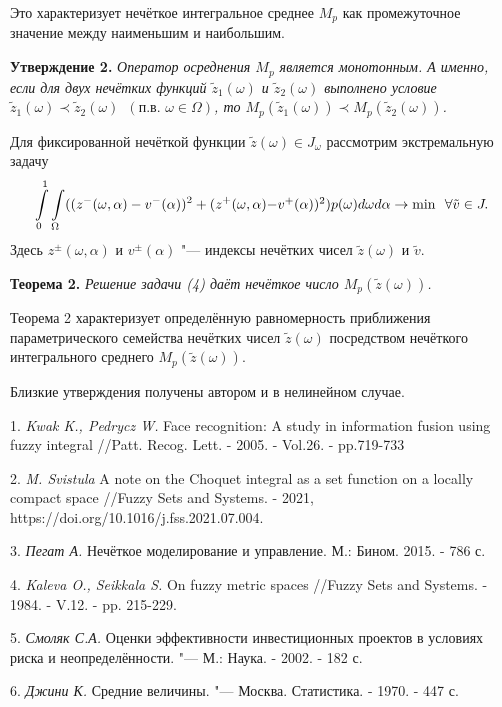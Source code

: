 Это характеризует нечёткое интегральное среднее $M_p$ как промежуточное значение между наименьшим и наибольшим.

\textbf{Утверждение  2.} \textit{Оператор осреднения $M_p$ является монотонным. А именно, если для двух нечётких функций $\tilde{z}_1(\omega)$ и  $\tilde{z}_2(\omega)$ выполнено условие  $\tilde{z}_1(\omega)\prec\tilde{z}_2(\omega)$\,\,\,$(\text{п.в.}\,\,\omega\in\Omega)$, то $M_p(\tilde{z}_1(\omega))\prec M_p(\tilde{z}_2(\omega))$.
}


Для фиксированной нечёткой функции $\tilde{z}(\omega)\in J_{\omega}$ рассмотрим экстремальную задачу
\begin{equation}
\int\limits_{0}^1\int\limits_{\Omega}((z^{-}(\omega, \alpha) - v^{-}(\alpha))^2 + (z^{+}(\omega, \alpha) $$$$- v^{+}(\alpha))^2)p(\omega)d\omega d\alpha\rightarrow\min\,\,\,\forall \tilde{v}\in J.
\end{equation}
Здесь $z^{\pm}(\omega, \alpha)$ и  $v^{\pm}(\alpha)$  "--- индексы нечётких  чисел $\tilde{z}(\omega)$ и  $\tilde{v}$.

\textbf{Теорема 2.} \textit{Решение задачи (4) даёт нечёткое число  $M_p(\tilde{z}(\omega))$. }


Теорема 2  характеризует определённую равномерность приближения параметрического семейства нечётких чисел $\tilde{z}(\omega)$ посредством нечёткого интегрального среднего $M_p(\tilde{z}(\omega))$.

Близкие  утверждения получены автором и в нелинейном случае.



\litlist

1. {\it Kwak K., Pedrycz W.}
Face recognition: A study in information fusion using fuzzy integral //Patt. Recog. Lett. - 2005. - Vol.26. - pp.719-733

2. {\it M. Svistula}
A note on the Choquet integral as a set function on a locally compact space //Fuzzy Sets and Systems. - 2021, https://doi.org/10.1016/j.fss.2021.07.004.


3. {\it Пегат А.}
Нечёткое моделирование и управление.  М.: Бином. 2015. - 786 с.


4. {\it Kaleva O., Seikkala S.}
On fuzzy metric spaces //Fuzzy Sets and Systems. - 1984. - V.12. - pp. 215-229.


5. {\it Смоляк С.А.}
Оценки эффективности инвестиционных проектов в условиях риска и неопределённости. "--- М.: Наука. - 2002. - 182 с.

6. {\it Джини К. }
Средние величины. "--- Москва. Статистика. -  1970. - 447 с.
